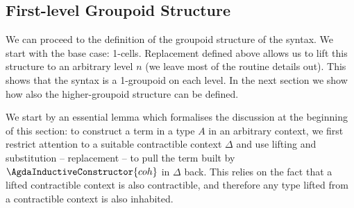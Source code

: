 \begin{code}\>\<%
\\
\> \<[8]%
\>[8]\AgdaSymbol{:} \AgdaSymbol{\}(} \AgdaSymbol{:} \AgdaSymbol{)(} \AgdaSymbol{:}  \AgdaSymbol{)} \<[34]%
\>[34]\<%
\\
\>[0]\<[8]%
\>[8]       \<%
\\
%
\\
\>   \AgdaSymbol{=}    \AgdaFunction{[}  \AgdaSymbol{\_}  \AgdaFunction{]T}\<%
\\
\>\<\end{code}


\subsection{First-level Groupoid Structure}
We can proceed to the definition of the groupoid structure of the syntax. We start with the base case: 1-cells. Replacement defined above allows us to lift this structure to an arbitrary level $n$ (we leave most of the routine details out). This shows that the syntax is a 1-groupoid on each level. In the next section we show how also the higher-groupoid structure can be defined. 

We start by an essential lemma which formalises the discussion at the
beginning of this section: to construct a term in a type $A$ in an
arbitrary context, we first restrict attention to a suitable
contractible context $\Delta$ and use lifting and substitution -- replacement -- to pull
 the term built by $\AgdaInductiveConstructor{coh}$ in $\Delta$
back. This relies on the fact that a lifted contractible context is
also contractible, and therefore any type lifted from a contractible
context is also inhabited.

